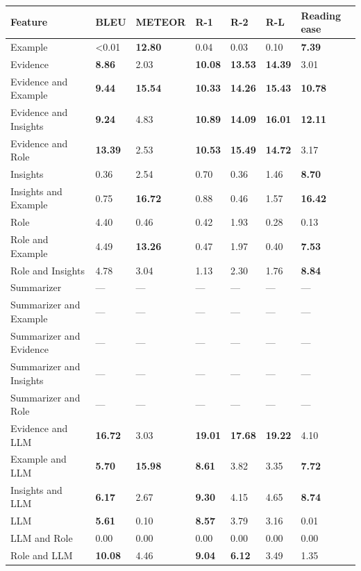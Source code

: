 \begin{tabular}{|l|l|l|l|l|l|l|}
\hline
\textbf{Feature} & BLEU & METEOR & R-1 & R-2 & R-L & Reading ease \\
 \hline
 Example & \textless{}0.01 & \textbf{12.80} & 0.04 & 0.03 & 0.10 & \textbf{7.39} \\
 \hline
 Evidence & \textbf{8.86} & 2.03 & \textbf{10.08} & \textbf{13.53} & \textbf{14.39} & 3.01 \\
 \hline
 Evidence and Example & \textbf{9.44} & \textbf{15.54} & \textbf{10.33} & \textbf{14.26} & \textbf{15.43} & \textbf{10.78} \\
 \hline
 Evidence and Insights & \textbf{9.24} & 4.83 & \textbf{10.89} & \textbf{14.09} & \textbf{16.01} & \textbf{12.11} \\
 \hline
 Evidence and Role & \textbf{13.39} & 2.53 & \textbf{10.53} & \textbf{15.49} & \textbf{14.72} & 3.17 \\
 \hline
 Insights & 0.36 & 2.54 & 0.70 & 0.36 & 1.46 & \textbf{8.70} \\
 \hline
 Insights and Example & 0.75 & \textbf{16.72} & 0.88 & 0.46 & 1.57 & \textbf{16.42} \\
 \hline
 Role & 4.40 & 0.46 & 0.42 & 1.93 & 0.28 & 0.13 \\
 \hline
 Role and Example & 4.49 & \textbf{13.26} & 0.47 & 1.97 & 0.40 & \textbf{7.53} \\
 \hline
 Role and Insights & 4.78 & 3.04 & 1.13 & 2.30 & 1.76 & \textbf{8.84} \\
 \hline
 Summarizer & — & — & — & — & — & — \\
 \hline
 Summarizer and Example & — & — & — & — & — & — \\
 \hline
 Summarizer and Evidence & — & — & — & — & — & — \\
 \hline
 Summarizer and Insights & — & — & — & — & — & — \\
 \hline
 Summarizer and Role & — & — & — & — & — & — \\
 \hline
 Evidence and LLM & \textbf{16.72} & 3.03 & \textbf{19.01} & \textbf{17.68} & \textbf{19.22} & 4.10 \\
 \hline
 Example and LLM & \textbf{5.70} & \textbf{15.98} & \textbf{8.61} & 3.82 & 3.35 & \textbf{7.72} \\
 \hline
 Insights and LLM & \textbf{6.17} & 2.67 & \textbf{9.30} & 4.15 & 4.65 & \textbf{8.74} \\
 \hline
 LLM & \textbf{5.61} & 0.10 & \textbf{8.57} & 3.79 & 3.16 & 0.01 \\
 \hline
 LLM and Role & 0.00 & 0.00 & 0.00 & 0.00 & 0.00 & 0.00 \\
 \hline
 Role and LLM & \textbf{10.08} & 4.46 & \textbf{9.04} & \textbf{6.12} & 3.49 & 1.35 \\
\hline
\end{tabular}
